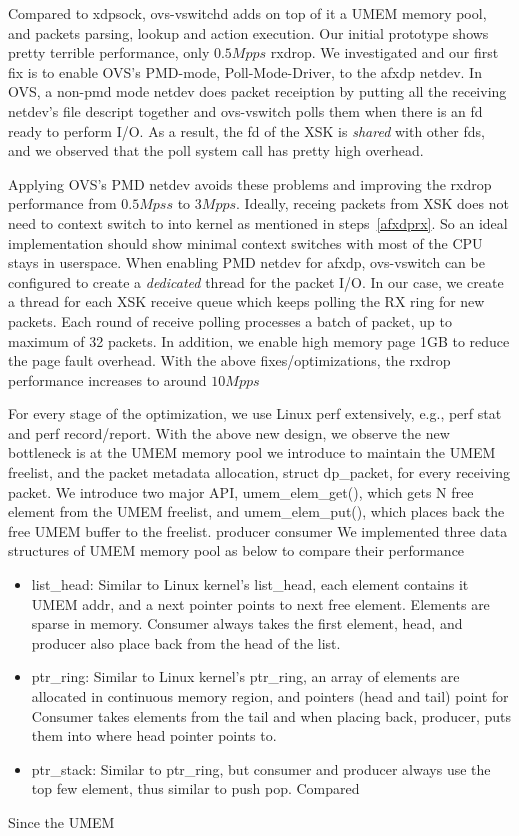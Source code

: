 \documentclass[10pt]{sigplanconf}
\begin{document}
Compared to xdpsock, ovs-vswitchd adds on top of it a UMEM memory pool,
and packets parsing, lookup and action execution.
Our initial prototype shows pretty terrible performance, only $0.5Mpps$ rxdrop.
We investigated and our first fix is to enable OVS's PMD-mode,
Poll-Mode-Driver, to the afxdp netdev.
In OVS, a non-pmd mode netdev does packet receiption by putting all the receiving
netdev's file descript together and ovs-vswitch polls them when there is an fd ready
to perform I/O.  As a result, the fd of the XSK is {\em shared} with other fds, and
we observed that the poll system call has pretty high overhead.

Applying OVS's PMD netdev avoids these problems and improving the rxdrop performance
from $0.5Mpss$ to $3Mpps$.  Ideally, receing packets from XSK does not need to context
switch to into kernel as mentioned in steps~\ref{afxdprx}. So an ideal implementation
should show minimal context switches with most of the CPU stays in userspace. 
When enabling PMD netdev for afxdp, ovs-vswitch can be
configured to create a {\em dedicated} thread for the packet I/O.  
In our case, we create a thread for each XSK receive queue which keeps polling
the RX ring for new packets.  Each round of receive polling processes a batch of
packet, up to maximum of 32 packets. In addition, we enable high memory page 1GB to
reduce the page fault overhead.  With the above fixes/optimizations, the rxdrop
performance increases to around $10Mpps$

For every stage of the optimization, we use Linux perf extensively, e.g., perf stat
and perf record/report.  With the above new design, we observe the new bottleneck
is at the UMEM memory pool we introduce to maintain the UMEM freelist, and the
packet metadata allocation, struct dp\_packet, for every receiving packet.
We introduce two major API, umem\_elem\_get(), which gets N free element from the
UMEM freelist, and umem\_elem\_put(), which places back the free UMEM buffer to
the freelist.
producer 
consumer
We implemented three data structures of UMEM memory pool as below
to compare their performance
\begin{itemize}
\item list\_head: Similar to Linux kernel's list\_head, each element contains it
UMEM addr, and a next pointer points to next free element. Elements are sparse in
memory. Consumer always takes the first element, head, and producer also place back
from the head of the list.
\item ptr\_ring: Similar to Linux kernel's ptr\_ring, an array of elements are
allocated in continuous memory region, and pointers (head and tail) point for
Consumer takes elements from the tail and when placing back, producer, puts
them into where head pointer points to.
\item ptr\_stack: Similar to ptr\_ring, but consumer and producer always use
the top few element, thus similar to push pop. Compared

\end{itemize}
Since the UMEM 
\end{document}
